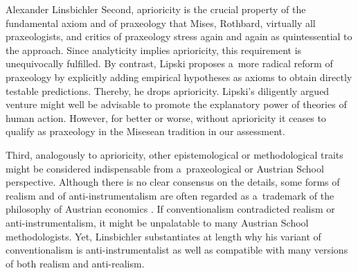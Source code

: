 \begin{artengenv}{Alexander Linsbichler}
Second, aprioricity is the crucial property of the fundamental axiom and of praxeology that Mises, Rothbard, virtually all praxeologists, and critics of praxeology stress again and again as quintessential to the approach. Since analyticity implies aprioricity, this requirement is unequivocally fulfilled. By contrast, Lipski 
\parencite*[][]{lipski_austrian_2021} %
 proposes a~more radical reform of praxeology by explicitly adding empirical hypotheses as axioms to obtain directly testable predictions. Thereby, he drops aprioricity. Lipski's diligently argued venture might well be advisable to promote the explanatory power of theories of human action. However, for better or worse, without aprioricity it ceases to qualify as praxeology in the Misesean tradition in our assessment.



Third, analogously to aprioricity, other epistemological or methodological traits might be considered indispensable from a~praxeological or Austrian School perspective. Although there is no clear consensus on the details, some forms of realism and of anti-instrumentalism are often regarded as a~trademark of the philosophy of Austrian economics 
\parencites[][]{heilmann_philosophy_2021}[][]{linsbichler_philosophy_2021}. %
 If conventionalism contradicted realism or anti-instrumentalism, it might be unpalatable to many Austrian School methodologists. Yet, Linsbichler 
\parencite*[][pp.3380–3383]{linsbichler_austrian_2021} %
 substantiates at length why his variant of conventionalism is anti-instrumentalist as well as compatible with many versions of both realism and anti-realism.




\end{artengenv}

